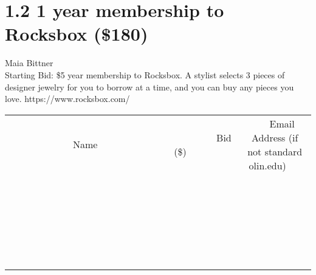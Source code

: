 \documentclass[11pt]{article}
\begin{document}
\section*{1.2 1 year membership to Rocksbox (\$180)}
Maia Bittner
\\
Starting Bid: \$5
 year membership to Rocksbox. A stylist selects 3 pieces of designer jewelry for you to borrow at a time, and you can buy any pieces you love.  https://www.rocksbox.com/
\\[6ex]
\begin{tabular}{c c c}
~~~~~~~~~~~~~Name~~~~~~~~~~~~~ & ~~~~~~~~~Bid (\$)~~~~~~~~~  & ~~~Email Address (if not standard olin.edu)~~~\\
 & & \\
\hline
 & & \\
\hline
 & & \\
\hline
 & & \\
\hline
 & & \\
\hline
 & & \\
\hline
 & & \\
\hline
 & & \\
\hline
 & & \\
\hline
 & & \\
\hline
 & & \\
\hline
 & & \\
\hline
 & & \\
\hline
 & & \\
\hline
 & & \\
\hline
 & & \\
\hline
 & & \\
\hline
 & & \\
\hline
 & & \\
\hline
 & & \\
\hline
 & & \\
\hline
 & & \\
\hline
 & & \\
\hline
 & & \\
\hline
 & & \\
\hline
 & & \\
\hline
\end{tabular}
\newpage
\end{document}
